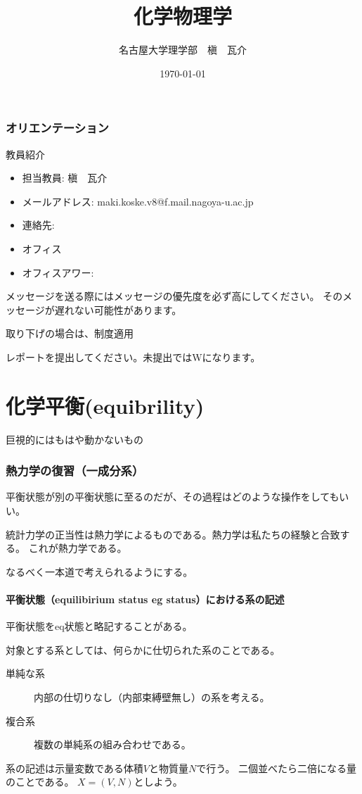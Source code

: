 \documentclass{ltjsarticle}
\begin{document}
\title{化学物理学}
\author{名古屋大学理学部　槇　瓦介}
\date{\today}

\maketitle

\tableofcontents

\section*{オリエンテーション}
\begin{mysimplebox}{教員紹介}
\begin{itemize}
\item 担当教員: 槇　瓦介
\item メールアドレス: maki.koske.v8@f.mail.nagoya-u.ac.jp
\item 連絡先:
\item オフィス
\item オフィスアワー:
\end{itemize} 
\end{mysimplebox}
メッセージを送る際にはメッセージの優先度を必ず高にしてください。
そのメッセージが遅れない可能性があります。

取り下げの場合は、制度適用

レポートを提出してください。未提出ではWになります。


\part{化学平衡(equibrility)}
巨視的にはもはや動かないもの
\section{熱力学の復習（一成分系）}
平衡状態が別の平衡状態に至るのだが、その過程はどのような操作をしてもいい。

統計力学の正当性は熱力学によるものである。熱力学は私たちの経験と合致する。
これが熱力学である。

なるべく一本道で考えられるようにする。
\subsection{平衡状態（equilibirium status eg status）における系の記述}
平衡状態をeq状態と略記することがある。

対象とする系としては、何らかに仕切られた系のことである。
\begin{description}
  \item[単純な系] 内部の仕切りなし（内部束縛壁無し）の系を考える。
  \item[複合系]  複数の単純系の組み合わせである。
\end{description}
系の記述は示量変数である体積\(V\)と物質量\(N\)で行う。
二個並べたら二倍になる量のことである。
\(X=(V,N)\)としよう。
\end{document}
